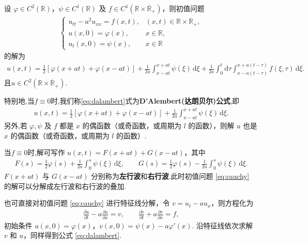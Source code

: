 \documentclass[../../main.tex]{subfiles}%
\begin{document}
\begin{theorem}\label{theroem:波动方程Cauchy初值问题的解}
设 $\varphi\in C^2(\mathbb{R})$，$\psi\in C^1(\mathbb{R})$ 及 $f\in C^1(\mathbb{R}\times\overline{\mathbb{R}}_+)$，则初值问题
\begin{align}
\begin{cases}
u_{tt}-a^2u_{xx}=f(x,t), & (x,t)\in\mathbb{R}\times\mathbb{R}_+, \\
u(x,0)=\varphi(x), & x\in\mathbb{R}, \\
u_t(x,0)=\psi(x), & x\in\mathbb{R}
\end{cases} \label{eq:cauchy}
\end{align}
的解为
\begin{align}
u(x,t)=\frac{1}{2}[\varphi(x+at)+\varphi(x-at)]+\frac{1}{2a}\int_{x-at}^{x+at}\psi(\xi)\,\mathrm{d}\xi +\frac{1}{2a}\int_0^t\mathrm{d}\tau\int_{x-a(t-\tau)}^{x+a(t-\tau)}f(\xi,\tau)\,\mathrm{d}\xi. \label{eq:dalambert}
\end{align}
且$u\in C^2(\mathbb{R}\times\overline{\mathbb{R}}_+)$.

特别地,当$f\equiv 0$时,我们称\eqref{eq:dalambert}式为\textbf{D'Alembert(达朗贝尔)公式},即
\begin{align*}
u(x,t)=\frac{1}{2}[\varphi(x+at)+\varphi(x-at)]+\frac{1}{2a}\int_{x-at}^{x+at}\psi(\xi)\,\mathrm{d}\xi.
\end{align*}
另外,若 $\varphi,\psi$ 及 $f$ 都是 $x$ 的偶函数（或奇函数，或周期为 $l$ 的函数），则解 $u$ 也是 $x$ 的偶函数（或奇函数，或周期为 $l$ 的函数）.
\end{theorem}
\begin{remark}
当$f\equiv 0$时,解可写作 $u(x,t)=F(x+at)+G(x-at)$，其中
\begin{align*}
F(s)=\frac{1}{2}\varphi(s)+\frac{1}{2a}\int_0^s\psi(\xi)\,\mathrm{d}\xi,\qquad
G(s)=\frac{1}{2}\varphi(s)-\frac{1}{2a}\int_0^s\psi(\xi)\,\mathrm{d}\xi.
\end{align*}
$F(x+at)$ 与 $G(x-at)$ 分别称为\textbf{左行波}和\textbf{右行波}.此时初值问题 \eqref{eq:cauchy} 的解可以分解成左行波和右行波的叠加.
\end{remark}
\begin{remark}
也可直接对初值问题 \eqref{eq:cauchy} 进行特征线分解，令 $v=u_t-au_x$，则方程化为
\begin{align*}
\frac{\partial u}{\partial t}-a\frac{\partial u}{\partial x}=v,\qquad
\frac{\partial v}{\partial t}+a\frac{\partial v}{\partial x}=f,
\end{align*}
初始条件 $u(x,0)=\varphi(x)$，$v(x,0)=\psi(x)-a\varphi'(x)$. 沿特征线依次求解 $v$ 和 $u$，同样得到公式 \eqref{eq:dalambert}.
\end{remark}
\end{document}
